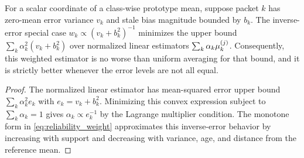 \begin{lemma}\label{lem:reliability}
For a scalar coordinate of a class-wise prototype mean, suppose packet $k$ has zero-mean error variance $v_k$ and stale bias magnitude bounded by $b_k$. The inverse-error special case $w_k\propto(v_k+b_k^2)^{-1}$ minimizes the upper bound $\sum_k \alpha_k^2(v_k+b_k^2)$ over normalized linear estimators $\sum_k\alpha_k\mu_k^{(j)}$. Consequently, this weighted estimator is no worse than uniform averaging for that bound, and it is strictly better whenever the error levels are not all equal.
\end{lemma}
\begin{proof}
The normalized linear estimator has mean-squared error upper bound $\sum_k\alpha_k^2 e_k$ with $e_k=v_k+b_k^2$. Minimizing this convex expression subject to $\sum_k\alpha_k=1$ gives $\alpha_k\propto e_k^{-1}$ by the Lagrange multiplier condition. The monotone form in \eqref{eq:reliability_weight} approximates this inverse-error behavior by increasing with support and decreasing with variance, age, and distance from the reference mean.
\end{proof}

